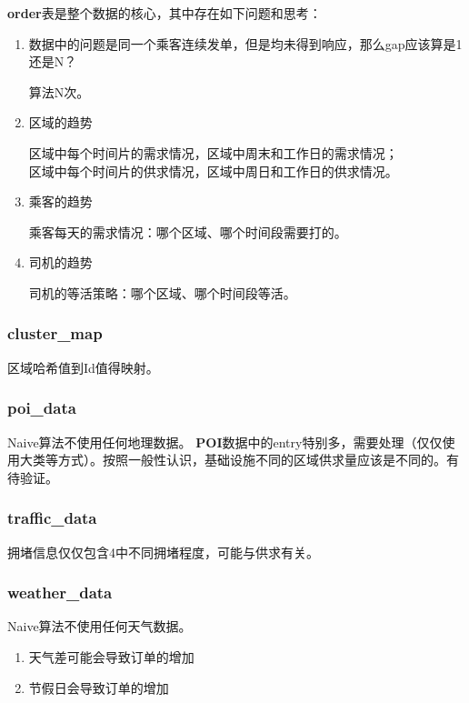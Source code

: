 \documentclass[hyperref,UTF8]{ctexart}
\theoremstyle{definition}
\theoremstyle{remark}
\numberwithin{equation}{subsection}
\newcommand{\Emph}{\textbf}
\begin{document}
	\Emph{order}表是整个数据的核心，其中存在如下问题和思考：
	\begin{enumerate}[(1)]
		
		\item 数据中的问题是同一个乘客连续发单，但是均未得到响应，那么gap应该算是1还是N？
		
        算法N次。
		
		\item 区域的趋势
		
		区域中每个时间片的需求情况，区域中周末和工作日的需求情况；	\\
		区域中每个时间片的供求情况，区域中周日和工作日的供求情况。
		
		\item 乘客的趋势
		
		乘客每天的需求情况：哪个区域、哪个时间段需要打的。
		
		\item 司机的趋势
		
		司机的等活策略：哪个区域、哪个时间段等活。
		
	\end{enumerate}
	
\subsubsection{cluster\_map}

	区域哈希值到Id值得映射。

\subsubsection{poi\_data}

	Naive算法不使用任何地理数据。
	\Emph{POI}数据中的entry特别多，需要处理（仅仅使用大类等方式）。按照一般性认识，基础设施不同的区域供求量应该是不同的。有待验证。

\subsubsection{traffic\_data}

	拥堵信息仅仅包含4中不同拥堵程度，可能与供求有关。

\subsubsection{weather\_data}

	Naive算法不使用任何天气数据。
	\begin{enumerate}[(1)]
		
		\item 天气差可能会导致订单的增加
		
		\item 节假日会导致订单的增加
		
	\end{enumerate}
	
\end{document}
